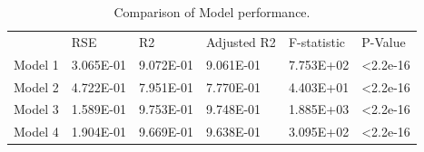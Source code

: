 \documentclass[review,12pt,authoryear]{elsarticle}
\begin{document}
\begin{linenumbers}
\begin{table}[]
\caption{Comparison of Model performance.}
\label{tab:tab 11}
\begin{tabular}{llllll}
        & RSE       & R2        & Adjusted 			R2 & F-statistic & P-Value           \\
Model 1 & 3.065E-01 & 9.072E-01 & 9.061E-01      & 7.753E+02   & \textless 2.2e-16 \\
Model 2 & 4.722E-01 & 7.951E-01 & 7.770E-01      & 4.403E+01   & \textless 2.2e-16 \\
Model 3 & 1.589E-01 & 9.753E-01 & 9.748E-01      & 1.885E+03   & \textless 2.2e-16 \\
Model 4 & 1.904E-01 & 9.669E-01 & 9.638E-01      & 3.095E+02   & \textless 2.2e-16
\end{tabular}
\end{table}

\fi
%



\end{linenumbers}
  
\end{document}
